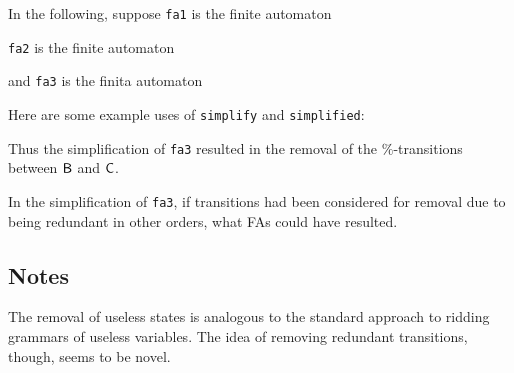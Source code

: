 In the following, suppose \texttt{fa1} is the finite automaton
\begin{center}

\end{center}
\texttt{fa2} is the finite automaton
\begin{center}

\end{center}
and \texttt{fa3} is the finita automaton
\begin{center}

\end{center}
Here are some example uses of \texttt{simplify} and \texttt{simplified}:

Thus the simplification of \texttt{fa3} resulted in the removal of
the $\%$-transitions between $\mathsf{B}$ and $\mathsf{C}$.

\begin{exercise}
In the simplification of \texttt{fa3}, if transitions had been
considered for removal due to being redundant in other orders,
what FAs could have resulted.
\end{exercise}

%
%

\subsection{Notes}

The removal of useless states is analogous to the standard approach to
ridding grammars of useless variables.  The idea of removing redundant
transitions, though, seems to be novel.

